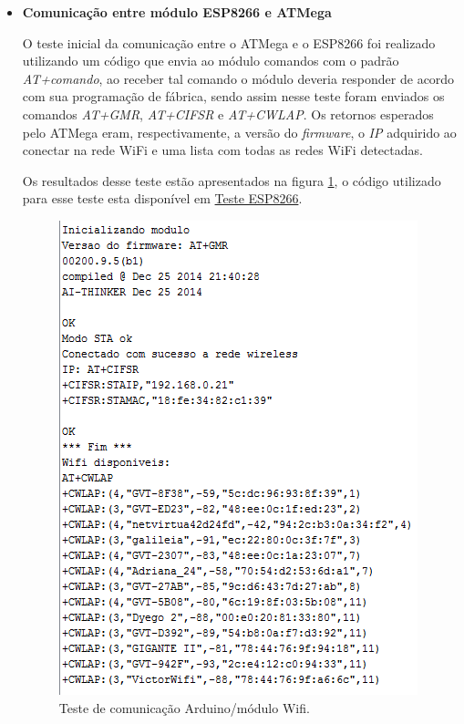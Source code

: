 		\begin{itemize}
			\item \textbf{Comunicação entre módulo ESP8266 e ATMega}

				O teste inicial da comunicação entre o ATMega e o ESP8266 foi realizado utilizando um código que envia ao módulo comandos com o padrão \textit{AT+comando}, ao receber tal comando o módulo deveria responder de acordo com sua programação de fábrica, sendo assim nesse teste foram enviados os comandos \textit{AT+GMR}, \textit{AT+CIFSR} e \textit{AT+CWLAP}. Os retornos esperados pelo ATMega eram, respectivamente, a versão do \textit{firmware}, o \textit{IP} adquirido ao conectar na rede WiFi e uma lista com todas as redes WiFi detectadas.

				Os resultados desse teste estão apresentados na figura \ref{img:teste_arduino_modulo}, o código utilizado para esse teste esta disponível em \href{https://github.com/kaiocoelho/CodigoESP/blob/master/codigo_teste/codigo_teste_inicial.ino}{Teste ESP8266}.

				\begin{figure}[H]                                                           
			  		\centering                    
			  		\includegraphics[scale=0.9]{figuras/testeModuloWifi}               
			  		\caption{Teste de comunicação Arduino/módulo Wifi.}    
			  		\label{img:teste_arduino_modulo}                                            
				\end{figure}


\end{itemize}
